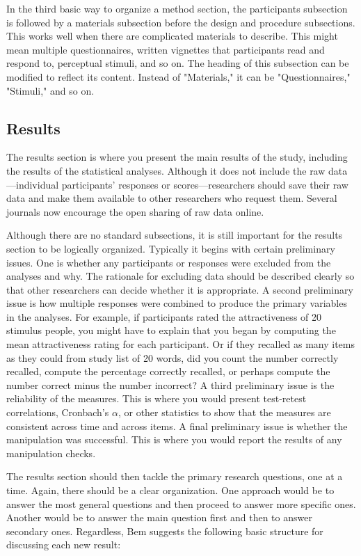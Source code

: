 In the third basic way to organize a method section, the participants subsection is followed by a materials subsection before the design and procedure subsections. This works well when there are complicated materials to describe. This might mean multiple questionnaires, written vignettes that participants read and respond to, perceptual stimuli, and so on. The heading of this subsection can be modified to reflect its content. Instead of "Materials," it can be "Questionnaires," "Stimuli," and so on.

\subsection{Results}

The results section is where you present the main results of the study, including the results of the statistical analyses. Although it does not include the raw data---individual participants' responses or scores---researchers should save their raw data and make them available to other researchers who request them. Several journals now encourage the open sharing of raw data online.

Although there are no standard subsections, it is still important for the results section to be logically organized. Typically it begins with certain preliminary issues. One is whether any participants or responses were excluded from the analyses and why. The rationale for excluding data should be described clearly so that other researchers can decide whether it is appropriate. A second preliminary issue is how multiple responses were combined to produce the primary variables in the analyses. For example, if participants rated the attractiveness of 20 stimulus people, you might have to explain that you began by computing the mean attractiveness rating for each participant. Or if they recalled as many items as they could from study list of 20 words, did you count the number correctly recalled, compute the percentage correctly recalled, or perhaps compute the number correct minus the number incorrect? A third preliminary issue is the reliability of the measures. This is where you would present test-retest correlations, Cronbach's $\alpha$, or other statistics to show that the measures are consistent across time and across items. A final preliminary issue is whether the manipulation was successful. This is where you would report the results of any manipulation checks.

The results section should then tackle the primary research questions, one at a time. Again, there should be a clear organization. One approach would be to answer the most general questions and then proceed to answer more specific ones. Another would be to answer the main question first and then to answer secondary ones. Regardless, Bem suggests the following basic structure for discussing each new result:

